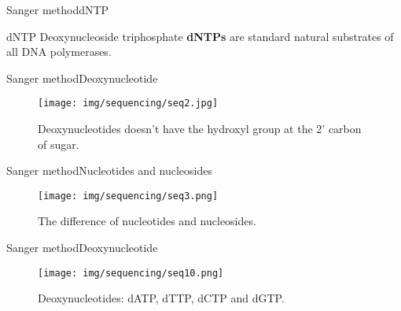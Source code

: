 \documentclass[10pt]{beamer}
\newcommand{\1}{
	\setbeamertemplate{background}{
		\texttt{[image: img/1]}
		\tikz[overlay] \fill[fill opacity=0.75,fill=white] (0,0) rectangle (-\paperwidth,\paperheight);
	}
}
\begin{document}
\begin{frame}{Sanger method}{dNTP}	
	\begin{block}{dNTP}
		Deoxynucleoside triphosphate \textbf{dNTPs} are standard natural substrates of all DNA polymerases.
	\end{block}
\end{frame}





\begin{frame}{Sanger method}{Deoxynucleotide}
	\begin{figure}[]
		\centering
		\texttt{[image: img/sequencing/seq2.jpg]}
		\label{img:mot2}
		\caption{Deoxynucleotides doesn't have the hydroxyl group at the 2' carbon of sugar.}
	\end{figure}
\end{frame}

\begin{frame}{Sanger method}{Nucleotides and nucleosides}
	\begin{figure}[]
		\centering
		\texttt{[image: img/sequencing/seq3.png]}
		\label{img:mot2}
		\caption{The difference of nucleotides and nucleosides.}
	\end{figure}
\end{frame}

\begin{frame}{Sanger method}{Deoxynucleotide}
	\begin{figure}[]
		\centering
		\texttt{[image: img/sequencing/seq10.png]}
		\label{img:mot2}
		\caption{Deoxynucleotides: dATP, dTTP, dCTP and dGTP.}
	\end{figure}
\end{frame}
\end{document}
